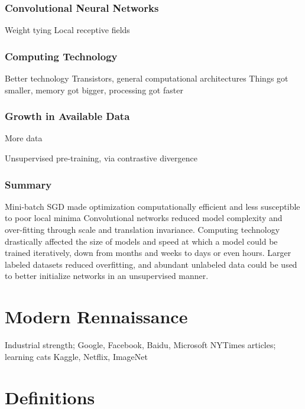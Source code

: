 \subsubsection{Convolutional Neural Networks}
\label{subsec:convnets}

Weight tying
Local receptive fields

\subsubsection{Computing Technology}
\label{subsubsec:hardware}

Better technology
Transistors, general computational architectures
Things got smaller, memory got bigger, processing got faster


\subsubsection{Growth in Available Data}
\label{subsec:perceptrons}

More data

Unsupervised pre-training, via contrastive divergence

\subsubsection{Summary}
\label{subsubsec:perceptrons}

Mini-batch SGD made optimization computationally efficient and less susceptible to poor local minima
Convolutional networks reduced model complexity and over-fitting through scale and translation invariance.
Computing technology drastically affected the size of models and speed at which a model could be trained iteratively, down from months and weeks to days or even hours.
Larger labeled datasets reduced overfitting, and abundant unlabeled data could be used to better initialize networks in an unsupervised manner.


\section{Modern Rennaissance}
\label{sec:rennaissance}

Industrial strength; Google, Facebook, Baidu, Microsoft
NYTimes articles; learning cats
Kaggle, Netflix, ImageNet



\section{Definitions}
\label{sec:example}

